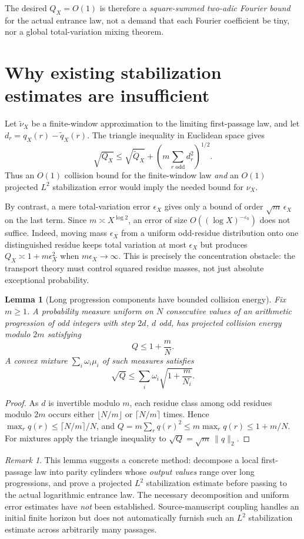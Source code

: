 \documentclass[11pt]{amsart}
\newtheorem{lemma}{Lemma}
\theoremstyle{remark}
\newtheorem{remark}{Remark}
\newcommand{\1}{\mathbf1}
\begin{document}
The desired $Q_X=O(1)$ is therefore a \emph{square-summed two-adic Fourier bound} for the actual entrance law, not a demand that each Fourier coefficient be tiny, nor a global total-variation mixing theorem.

\section{Why existing stabilization estimates are insufficient}
Let $\widetilde\nu_X$ be a finite-window approximation to the limiting first-passage law, and let $d_r=q_X(r)-\widetilde q_X(r)$.  The triangle inequality in Euclidean space gives
\begin{equation}\label{eq:transfer}
 \boxed{\sqrt{Q_X}\le \sqrt{\widetilde Q_X}
 +\left(m\sum_{r\text{ odd}}d_r^2\right)^{1/2}.}
\end{equation}
Thus an $O(1)$ collision bound for the finite-window law \emph{and} an $O(1)$ projected $L^2$ stabilization error would imply the needed bound for $\nu_X$.

By contrast, a mere total-variation error $\epsilon_X$ gives only a bound of order $\sqrt{m}\,\epsilon_X$ on the last term. Since $m\asymp X^{\log2}$, an error of size $O((\log X)^{-\varepsilon_0})$ does not suffice.  Indeed, moving mass $\epsilon_X$ from a uniform odd-residue distribution onto one distinguished residue keeps total variation at most $\epsilon_X$ but produces $Q_X\asymp1+m\epsilon_X^2$ when $m\epsilon_X\to\infty$. This is precisely the concentration obstacle: the transport theory must control squared residue masses, not just absolute exceptional probability.

\begin{lemma}[Long progression components have bounded collision energy]
Fix $m\ge1$. A probability measure uniform on $N$ consecutive values of an arithmetic progression of \emph{odd} integers with step $2d$, $d$ odd, has projected collision energy modulo $2m$ satisfying
\[
 Q\le 1+\frac{m}{N}.
\]
A convex mixture $\sum_i\omega_i\mu_i$ of such measures satisfies
\[
 \sqrt{Q}\le\sum_i\omega_i\sqrt{1+\frac{m}{N_i}}.
\]
\end{lemma}
\begin{proof}
As $d$ is invertible modulo $m$, each residue class among odd residues modulo $2m$ occurs either $\lfloor N/m\rfloor$ or $\lceil N/m\rceil$ times. Hence $\max_r q(r)\le\lceil N/m\rceil/N$, and $Q=m\sum_rq(r)^2\le m\max_rq(r)\le1+m/N$. For mixtures apply the triangle inequality to $\sqrt Q=\sqrt m\,\|q\|_2$.
\end{proof}
\begin{remark}
This lemma suggests a concrete method: decompose a local first-passage law into parity cylinders whose \emph{output values} range over long progressions, and prove a projected $L^2$ stabilization estimate before passing to the actual logarithmic entrance law.  The necessary decomposition and uniform error estimates have \emph{not} been established.  Source-manuscript coupling handles an initial finite horizon but does not automatically furnish such an $L^2$ stabilization estimate across arbitrarily many passages.
\end{remark}
\end{document}
